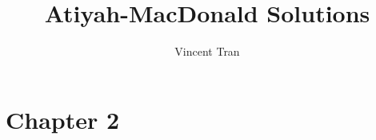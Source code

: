 \documentclass[a4paper]{exam}
\title{Atiyah-MacDonald Solutions}
\author{Vincent Tran}
\begin{document}
\maketitle

\section{Chapter 2}

%
%
%
%
\end{document}
